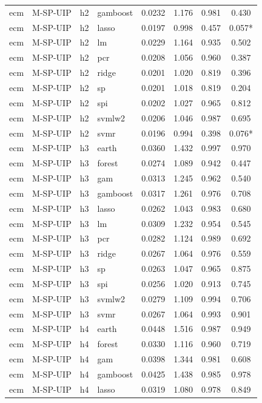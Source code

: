 \begin{ThreePartTable}
\begin{longtable}[t]{llclcccc}
ecm & M-SP-UIP & h2 & gamboost & 0.0232 & 1.176 & 0.981 & 0.430\\
ecm & M-SP-UIP & h2 & lasso & 0.0197 & 0.998 & 0.457 & 0.057*\\
ecm & M-SP-UIP & h2 & lm & 0.0229 & 1.164 & 0.935 & 0.502\\
ecm & M-SP-UIP & h2 & pcr & 0.0208 & 1.056 & 0.960 & 0.387\\
ecm & M-SP-UIP & h2 & ridge & 0.0201 & 1.020 & 0.819 & 0.396\\
ecm & M-SP-UIP & h2 & sp & 0.0201 & 1.018 & 0.819 & 0.204\\
ecm & M-SP-UIP & h2 & spi & 0.0202 & 1.027 & 0.965 & 0.812\\
ecm & M-SP-UIP & h2 & svmlw2 & 0.0206 & 1.046 & 0.987 & 0.695\\
ecm & M-SP-UIP & h2 & svmr & 0.0196 & 0.994 & 0.398 & 0.076*\\
\addlinespace
ecm & M-SP-UIP & h3 & earth & 0.0360 & 1.432 & 0.997 & 0.970\\
ecm & M-SP-UIP & h3 & forest & 0.0274 & 1.089 & 0.942 & 0.447\\
ecm & M-SP-UIP & h3 & gam & 0.0313 & 1.245 & 0.962 & 0.540\\
ecm & M-SP-UIP & h3 & gamboost & 0.0317 & 1.261 & 0.976 & 0.708\\
ecm & M-SP-UIP & h3 & lasso & 0.0262 & 1.043 & 0.983 & 0.680\\
ecm & M-SP-UIP & h3 & lm & 0.0309 & 1.232 & 0.954 & 0.545\\
ecm & M-SP-UIP & h3 & pcr & 0.0282 & 1.124 & 0.989 & 0.692\\
ecm & M-SP-UIP & h3 & ridge & 0.0267 & 1.064 & 0.976 & 0.559\\
ecm & M-SP-UIP & h3 & sp & 0.0263 & 1.047 & 0.965 & 0.875\\
ecm & M-SP-UIP & h3 & spi & 0.0256 & 1.020 & 0.913 & 0.745\\
ecm & M-SP-UIP & h3 & svmlw2 & 0.0279 & 1.109 & 0.994 & 0.706\\
ecm & M-SP-UIP & h3 & svmr & 0.0267 & 1.064 & 0.993 & 0.901\\
\addlinespace
ecm & M-SP-UIP & h4 & earth & 0.0448 & 1.516 & 0.987 & 0.949\\
ecm & M-SP-UIP & h4 & forest & 0.0330 & 1.116 & 0.960 & 0.719\\
ecm & M-SP-UIP & h4 & gam & 0.0398 & 1.344 & 0.981 & 0.608\\
ecm & M-SP-UIP & h4 & gamboost & 0.0425 & 1.438 & 0.985 & 0.978\\
ecm & M-SP-UIP & h4 & lasso & 0.0319 & 1.080 & 0.978 & 0.849\\

\end{longtable}
\end{ThreePartTable}
